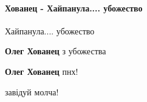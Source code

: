  
 
 
 
 
\paragraph{Хованец - Хайпанула.... убожество}
\label{sec:24_07_2021.fb.hvylja_oksana.1.uvolnenie_harkov_kiosk.cmt.hovanec_hajpanula}

\begin{itemize}
 
Хайпанула.... убожество

\begin{itemize}
 
\textbf{Олег Хованец} з убожества

 
\textbf{Олег Хованец} пнх!

 
завідуй молча! 🤣

 

\end{itemize}
\end{itemize}
